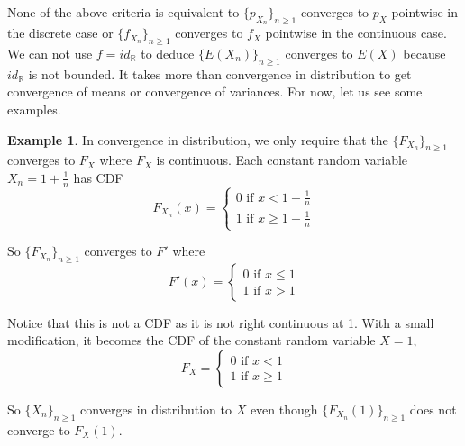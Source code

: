 \documentclass[12pt]{amsart}
\theoremstyle{definition}
\newtheorem{example}[theorem]{Example}
\begin{document}
None of the above criteria is equivalent to $\{p_{X_n}\}_{n \geq 1}$ converges to $p_X$ pointwise in the discrete case or $\{f_{X_n}\}_{n \geq 1}$ converges to $f_X$ pointwise in the continuous case. We can not use $f = id_{\mathbb{R}}$ to deduce $\{E(X_n)\}_{n \geq 1}$ converges to $E(X)$ because $id_{\mathbb{R}}$ is not bounded. It takes more than convergence in distribution to get convergence of means or convergence of variances. For now, let us see some examples.

\begin{example} \label{convergence_in_distribution_1} In convergence in distribution, we only require that the $\{F_{X_n}\}_{n \geq 1}$ converges to $F_X$ where $F_X$ is continuous. Each constant random variable $X_n = 1 + \frac{1}{n}$ has CDF
$$F_{X_n}(x) = \begin{cases} 0 \text{ if } x < 1 + \frac{1}{n} \\ 1 \text{ if } x \geq 1 + \frac{1}{n} \end{cases}$$

So $\{F_{X_n}\}_{n \geq 1}$ converges to $F'$ where
$$F'(x) = \begin{cases} 0 \text{ if } x \leq 1 \\ 1 \text{ if } x > 1\end{cases}$$

Notice that this is not a CDF as it is not right continuous at 1. With a small modification, it becomes the CDF of the constant random variable $X = 1$,
$$F_X= \begin{cases} 0 \text{ if } x < 1 \\ 1 \text{ if } x \geq 1 \end{cases}$$

So $\{X_n\}_{n \geq 1}$ converges in distribution to $X$ even though $\{F_{X_n}(1)\}_{n \geq 1}$ does not converge to $F_X(1)$.
\end{example}
\end{document}
